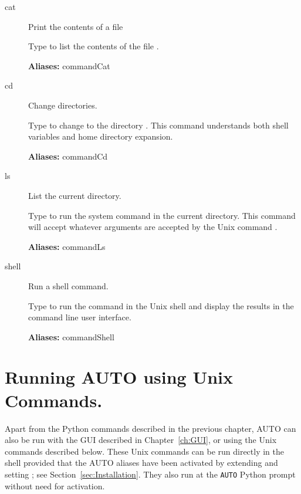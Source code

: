 \documentclass[12pt]{report}
\begin{document}
\begin{description}
\item[cat]
Print the contents of a file

    Type  to list the contents of the file .
    
\textbf{Aliases:} commandCat

\item[cd]
Change directories.
    
    Type  to change to the directory .  This command
    understands both shell variables and home directory expansion.
    
\textbf{Aliases:} commandCd 

\item[ls]
List the current directory.
    
    Type  to run the system  command in the
    current directory.
    This command will accept whatever arguments are accepted by the Unix command
    .
    
\textbf{Aliases:} commandLs

\item[shell]
Run a shell command.
        
    Type  to run the command 
    in the Unix shell and display
    the results in the \AUTO command line user interface.
    
\textbf{Aliases:} commandShell
\end{description}


\chapter{ Running {\cal AUTO} using Unix Commands.} \label{sec:command_mode}
Apart from the Python commands described in the previous chapter,
{\cal AUTO} can also be run with the GUI described in Chapter~\ref{ch:GUI},
or using the Unix commands described below. These Unix commands can be run
directly in the shell provided that the {\cal AUTO} aliases have been
activated by extending  and setting ;
see Section~\ref{sec:Installation}.
They also run at the {\tt AUTO} Python prompt without need for
activation.
\end{document}
